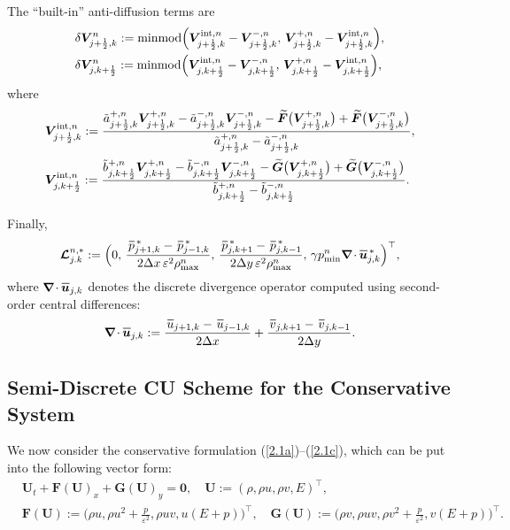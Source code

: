 \documentclass[preprint,12pt]{elsarticle}
\def\bnabla{\bm{\nabla}}
\newcommand{\dx}{\Delta x}
\newcommand{\dy}{\Delta y}
\newcommand{\kph}{{k+\frac{1}{2}}}
\newcommand{\jph}{{j+\frac{1}{2}}}
\newcommand{\mF}{\bm{F}}
\newcommand{\mG}{\bm{G}}
\newcommand{\ve}{\varepsilon}
\newcommand\eref[1]{(\ref{#1})}
\newcommand*\xbar[1]{%
	\hbox{%
		\vbox{%
			\hrule height 0.5pt %
			\kern0.4ex%
			\hbox{%
				\kern-0.05em%
				\ensuremath{#1}%
				\kern-0.00em%
			}%
		}%
	}%
}
\begin{document}
The ``built-in'' anti-diffusion terms are
$$
\begin{aligned}
	&\delta\bm V_{\jph,k}^n:={\rm minmod}\Big(\bm V_{\jph,k}^{{\rm int},n}-\bm V^{-,n}_{\jph,k},\,
	\bm V^{+,n}_{\jph,k}-\bm V_{\jph,k}^{{\rm int},n}\Big),\\
	&\delta\bm V_{j,\kph}^n:={\rm minmod}\Big(\bm V_{j,\kph}^{{\rm int},n}-\bm V^{-,n}_{j,\kph},\,
	\bm V^{+,n}_{j,\kph}-\bm V_{j,\kph}^{{\rm int},n}\Big),
\end{aligned}
$$
where 
$$
\begin{aligned}
	&\bm V_{\jph,k}^{{\rm int},n}:=\frac{\tilde a^{+,n}_{\jph,k}\bm V^{+,n}_{\jph,k}-\tilde a^{-,n}_{\jph,k}\bm V^{-,n}_{\jph,k}
		-\widetilde{\bm F}\big(\bm V^{+,n}_{\jph,k}\big)+\widetilde{\bm F}\big(\bm V^{-,n}_{\jph,k}\big)}
	{\tilde a^{+,n}_{\jph,k}-\tilde a^{-,n}_{\jph,k}},\\[0.3ex]
	&\bm V_{j,\kph}^{{\rm int},n}:=\frac{\tilde b^{+,n}_{j,\kph}\bm V^{+,n}_{j,\kph}-\tilde b^{-,n}_{j,\kph}\bm V^{-,n}_{j,\kph}
		-\widetilde{\bm G}\big(\bm V^{+,n}_{j,\kph}\big)+\widetilde{\bm G}\big(\bm V^{-,n}_{j,\kph}\big)}
	{\tilde b^{+,n}_{j,\kph}-\tilde b^{-,n}_{j,\kph}}.
\end{aligned}
$$

Finally,
\begin{equation}
	\bm{{\cal L}}^{n,*}_{j.k}:=\Big(0,\,\frac{\,\xbar p_{j+1,k}^{\,*}-\,\xbar p_{j-1,k}^{\,*}}{2\dx\,\ve^2\rho_{\max}^n},\,
	\frac{\,\xbar p_{j,k+1}^{\,*}-\,\xbar p_{j,k-1}^{\,*}}{2\dy\,\ve^2\rho_{\max}^n},\,
	\gamma p_{\min}^n\bnabla\!\cdot\xbar{\bm u}_{j,k}^{\,*}\Big)^\top,
	\label{4.48b}
\end{equation}
where $\bnabla\!\cdot\xbar{\bm u}_{j,k}$ denotes the discrete divergence operator computed using second-order central differences:
\begin{equation}
	\bnabla\!\cdot\xbar{\bm u}_{j,k}:=\frac{\,\xbar u_{j+1,k}-\,\xbar u_{j-1,k}}{2\dx}+\frac{\,\xbar v_{j,k+1}-\,\xbar v_{j,k-1}}{2\dy}.
	\label{3.38f}
\end{equation}

\subsection{Semi-Discrete CU Scheme for the Conservative System}\label{sec42}
We now consider the conservative formulation \eref{2.1a}--\eref{2.1c}, which can be put into the following vector form:
\begin{equation}
	\begin{aligned}
		&\bm U_t+\mF(\bm U)_x+\mG(\bm U)_y=\bm0,\quad\bm U:=(\rho,\rho u,\rho v,E)^\top,\\
		&\mF(\bm U):=\Big(\rho u,\rho u^2+\frac{p}{\ve^2},\rho uv,u(E+p)\Big)^\top,\quad
		\mG(\bm U):=\Big(\rho v,\rho uv,\rho v^2+\frac{p}{\ve^2},v(E+p)\Big)^\top.
	\end{aligned}
	\label{3.39g}
\end{equation}
\end{document}
